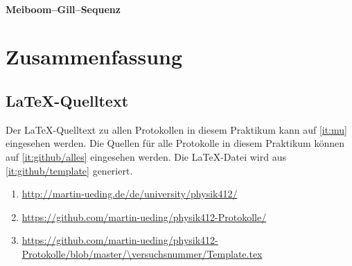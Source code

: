 \FloatBarrier
\subsubsection{Meiboom–Gill–Sequenz}


\FloatBarrier
\chapter{Zusammenfassung}

\fehlt


\FloatBarrier
\begin{appendix}
    \FloatBarrier
    \chapter{\LaTeX-Quelltext}

    Der \LaTeX-Quelltext zu allen Protokollen in diesem Praktikum kann auf
    \ref{it:mu} eingesehen werden. Die Quellen für alle Protokolle in diesem
    Praktikum können auf \ref{it:github/alles} eingesehen werden. Die
    \LaTeX-Datei wird aus \ref{it:github/template} generiert.

    \begin{enumerate}
        \item
            \label{it:mu}
            \url{http://martin-ueding.de/de/university/physik412/}
        \item
            \label{it:github/alles}
            \url{https://github.com/martin-ueding/physik412-Protokolle/}
        \item
            \label{it:github/template}
            \url{https://github.com/martin-ueding/physik412-Protokolle/blob/master/\versuchsnummer/Template.tex}
    \end{enumerate}
\end{appendix}


\FloatBarrier
\printbibliography




